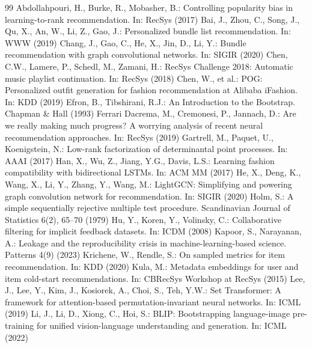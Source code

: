 \documentclass[runningheads]{llncs}
\begin{document}
\begin{thebibliography}{99}\scriptsize
{} Abdollahpouri, H., Burke, R., Mobasher, B.: Controlling popularity bias in learning-to-rank recommendation. In: RecSys (2017)
 Bai, J., Zhou, C., Song, J., Qu, X., An, W., Li, Z., Gao, J.: Personalized bundle list recommendation. In: WWW (2019)
 Chang, J., Gao, C., He, X., Jin, D., Li, Y.: Bundle recommendation with graph convolutional networks. In: SIGIR (2020)
 Chen, C.W., Lamere, P., Schedl, M., Zamani, H.: RecSys Challenge 2018: Automatic music playlist continuation. In: RecSys (2018)
 Chen, W., et al.: POG: Personalized outfit generation for fashion recommendation at Alibaba iFashion. In: KDD (2019)
 Efron, B., Tibshirani, R.J.: An Introduction to the Bootstrap. Chapman \& Hall (1993)
 Ferrari Dacrema, M., Cremonesi, P., Jannach, D.: Are we really making much progress? A worrying analysis of recent neural recommendation approaches. In: RecSys (2019)
 Gartrell, M., Paquet, U., Koenigstein, N.: Low-rank factorization of determinantal point processes. In: AAAI (2017)
 Han, X., Wu, Z., Jiang, Y.G., Davis, L.S.: Learning fashion compatibility with bidirectional LSTMs. In: ACM MM (2017)
 He, X., Deng, K., Wang, X., Li, Y., Zhang, Y., Wang, M.: LightGCN: Simplifying and powering graph convolution network for recommendation. In: SIGIR (2020)
 Holm, S.: A simple sequentially rejective multiple test procedure. Scandinavian Journal of Statistics 6(2), 65--70 (1979)
 Hu, Y., Koren, Y., Volinsky, C.: Collaborative filtering for implicit feedback datasets. In: ICDM (2008)
 Kapoor, S., Narayanan, A.: Leakage and the reproducibility crisis in machine-learning-based science. Patterns 4(9) (2023)
 Krichene, W., Rendle, S.: On sampled metrics for item recommendation. In: KDD (2020)
 Kula, M.: Metadata embeddings for user and item cold-start recommendations. In: CBRecSys Workshop at RecSys (2015)
 Lee, J., Lee, Y., Kim, J., Kosiorek, A., Choi, S., Teh, Y.W.: Set Transformer: A framework for attention-based permutation-invariant neural networks. In: ICML (2019)
 Li, J., Li, D., Xiong, C., Hoi, S.: BLIP: Bootstrapping language-image pre-training for unified vision-language understanding and generation. In: ICML (2022)

\end{thebibliography}
\end{document}
